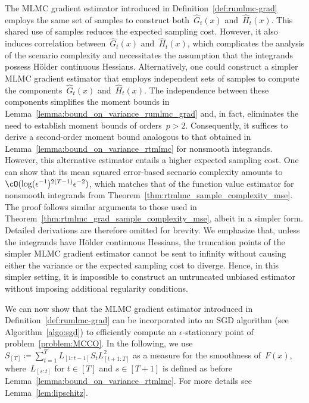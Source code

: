 \documentclass[11pt]{article}
\let\hat\widehat
\begin{document}
\begin{rem} \label{rem:extension_to_untruncated_grad}
    The MLMC gradient estimator introduced in Definition~\ref{def:rumlmc-grad} employs the same set of samples to construct both~$\hat{G}_t(x)$ and~$\hat{H}_t(x)$. This shared use of samples reduces the expected sampling cost. However, it also induces correlation between~$\hat{G}_t(x)$ and~$\hat{H}_t(x)$, which complicates the analysis of the scenario complexity and necessitates the assumption that the integrands possess Hölder continuous Hessians. Alternatively, one could construct a simpler MLMC gradient estimator that employs independent sets of samples to compute the components~$\hat{G}_t(x)$ and~$\hat{H}_t(x)$. The independence between these components simplifies the moment bounds in Lemma~\ref{lemma:bound_on_variance_rumlmc_grad} and, in fact, eliminates the need to establish moment bounds of orders~$p > 2$. Consequently, it suffices to derive a second-order moment bound analogous to that obtained in Lemma~\ref{lemma:bound_on_variance_rtmlmc} for nonsmooth integrands. However, this alternative estimator entails a higher expected sampling cost. One can show that its mean squared error-based scenario complexity amounts to $\cO(\log(\epsilon^{-1})^{2(T-1)}\epsilon^{-2})$, which matches that of the function value estimator for nonsmooth integrands from Theorem~\ref{thm:rtmlmc_sample_complexity_mse}. The proof follows similar arguments to those used in Theorem~\ref{thm:rtmlmc_grad_sample_complexity_mse}, albeit in a simpler form. Detailed derivations are therefore omitted for brevity. We emphasize that, unless the integrands have Hölder continuous Hessians, the truncation points of the simpler MLMC gradient estimator cannot be sent to infinity without causing either the variance or the expected sampling cost to diverge. Hence, in this simpler setting, it is impossible to construct an untruncated unbiased estimator without imposing additional regularity conditions.  
\end{rem}

We can now show that the MLMC gradient estimator introduced in Definition~\ref{def:rumlmc-grad} can be incorporated into an SGD algorithm (see Algorithm~\ref{algo:sgd}) to efficiently compute an $\epsilon$-stationary point of problem~\eqref{problem:MCCO}. In the following, we use $S_{[T]}\coloneqq\sum_{t=1}^{T} L_{[1:t-1]} S_t L_{[t+1:T]}^2$ as a measure for the smoothness of~$F(x)$, where~$L_{[s:t]}$ for $t\in[T]$ and $s\in[T+1]$ is defined as before Lemma~\ref{lemma:bound_on_variance_rtmlmc}. For more details see Lemma~\ref{lem:lipschitz}.
\end{document}
